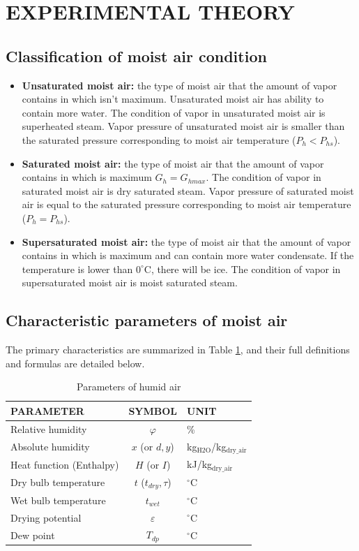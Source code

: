 \section{EXPERIMENTAL THEORY}
\subsection{Classification of moist air condition}
\begin{itemize}
    \item \textbf{Unsaturated moist air:} the type of moist air that the amount of vapor contains in which isn’t maximum. Unsaturated moist air has ability to contain more water. The condition of vapor in unsaturated moist air is superheated steam. Vapor pressure of unsaturated moist air is smaller than the saturated pressure corresponding to moist air temperature ($P_h < P_{hs}$).
    \item \textbf{Saturated moist air:} the type of moist air that the amount of vapor contains in which is maximum $G_h = G_{hmax}$. The condition of vapor in saturated moist air is dry saturated steam. Vapor pressure of saturated moist air is equal to the saturated pressure corresponding to moist air temperature ($P_h = P_{hs}$).
    \item \textbf{Supersaturated moist air:} the type of moist air that the amount of vapor contains in which is maximum and can contain more water condensate. If the temperature is lower than $0^\circ\text{C}$, there will be ice. The condition of vapor in supersaturated moist air is moist saturated steam.
\end{itemize}

\subsection{Characteristic parameters of moist air}
The primary characteristics are summarized in Table \ref{tab:params}, and their full definitions and formulas are detailed below.

\begin{table}[H]
\centering
\begin{tabular}{|l|c|l|}
\hline
\textbf{PARAMETER} & \textbf{SYMBOL} & \textbf{UNIT} \\ \hline
Relative humidity & $\varphi$ & \% \\ \hline
Absolute humidity & $x$ (or $d, y$) & kg$_{\text{H2O}}$/kg$_{\text{dry\_air}}$ \\ \hline
Heat function (Enthalpy) & $H$ (or $I$) & kJ/kg$_{\text{dry\_air}}$ \\ \hline
Dry bulb temperature & $t$ ($t_{dry}, \tau$) & $^\circ$C \\ \hline
Wet bulb temperature & $t_{wet}$ & $^\circ$C \\ \hline
Drying potential & $\varepsilon$ & $^\circ$C \\ \hline
Dew point & $T_{dp}$ & $^\circ$C \\ \hline
\end{tabular}
\caption{Parameters of humid air}
\label{tab:params}
\end{table}


